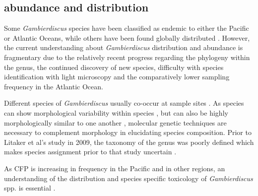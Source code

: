 \documentclass[12pt]{article}
\begin{document}
\subsection{abundance and distribution}
Some \emph{Gambierdiscus} species have been classified as endemic to either the Pacific or Atlantic Oceans, while others have been found globally distributed \cite{berdalet2012global,litaker2010global}. %
However, the current understanding about \emph{Gambierdiscus} distribution and abundance is fragmentary due to the relatively recent progress regarding the phylogeny within the genus, the continued discovery of new species, difficulty with species identification with light microscopy \cite{berdalet2012global} and the comparatively lower sampling frequency in the Atlantic Ocean. 

Different species of \emph{Gambierdiscus} usually co-occur at sample sites \cite{litaker2010global}. As species can show morphological variability within species \cite{bravo2014cellular}, but can also be highly morphologically similar to one another \cite{kohli2014high}, molecular genetic techniques are necessary to complement morphology in elucidating species composition. Prior to Litaker et al's study in 2009, the taxonomy of the genus was poorly defined which makes species assignment prior to that study uncertain \cite{berdalet2012global}. %

 As CFP is increasing in frequency in the Pacific \cite{skinner2011ciguatera} and in other regions, an understanding of the distribution and species specific toxicology of \emph{Gambierdiscus} spp. is essential \cite{globalcig}.
 
\end{document}
